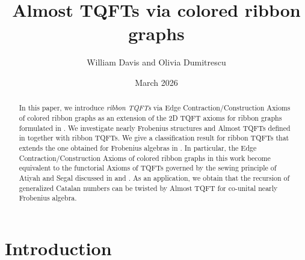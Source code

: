 \documentclass{amsart}
\title{Almost TQFTs via colored ribbon graphs}
\author{William Davis and Olivia Dumitrescu}
\date{March 2026}
\newcommand\blfootnote[1]{
    \begingroup
    \renewcommand\thefootnote{}\footnote{#1}
    \addtocounter{footnote}{-1}
    \endgroup
}
\theoremstyle{definition}
\begin{document}


\begin{abstract}
In this paper, we introduce \textit{ribbon TQFTs} via Edge Contraction/Construction Axioms of colored ribbon graphs as an extension of the 2D TQFT axioms for ribbon graphs formulated in \cite{DM_ribbon}. We investigate nearly Frobenius structures and Almost TQFTs defined in \cite{GLSU} together with ribbon TQFTs. We give a classification result for ribbon TQFTs that extends the one obtained for Frobenius algebras in \cite{DM_ribbon}. In particular, the Edge Contraction/Construction Axioms of colored ribbon graphs in this work become equivalent to the functorial Axioms of TQFTs governed by the sewing principle of Atiyah and Segal discussed  in \cite{DaDu} and \cite{GLSU}. As an application, we obtain that the recursion of generalized Catalan numbers can be twisted by Almost TQFT for co-unital nearly Frobenius algebra.












\end{abstract}




\maketitle
\tableofcontents




\section{Introduction}
\end{document}
